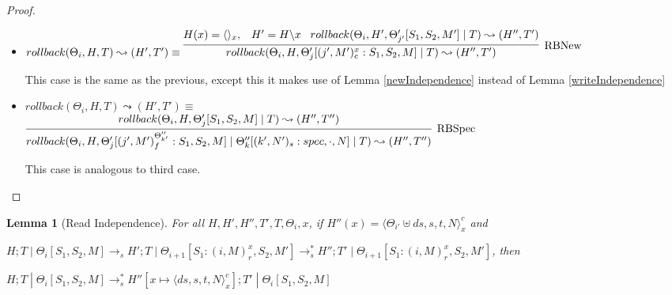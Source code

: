 \documentclass[9pt]{article}
\newtheorem{lemma}{Lemma}
\newcommand\specStep{\rightarrow_{s}}
\begin{document}
\begin{proof}
\begin{itemize}
\item $rollback(\Theta_i, H, T) \leadsto (H', T') \equiv \infer[\text{RBNew}]{rollback(\Theta_i, H, \Theta_j'[(j', M')_c^x : S_1, S_2, M] \; | \; T) \leadsto (H'', T')}{H(x) = \langle\rangle_x, \;\;\; H' = H \backslash x \;\;\; rollback(\Theta_i, H', \Theta_{j'}'[S_1, S_2, M'] \; | \; T) \leadsto (H'', T')}$

This case is the same as the previous, except this it makes use of Lemma \ref{newIndependence} instead of Lemma \ref{writeIndependence}

\item $rollback(\Theta_i, H, T) \leadsto (H', T') \equiv$ \\
$ \infer[\text{RBSpec}]{rollback(\Theta_i, H, \Theta_j'[(j', M')_f^{\Theta_{k'}''} : S_1, S_2, M] \; | \; \Theta_k''[(k', N')_s : spec, \cdot, N] \; | \; T) \leadsto (H'', T'')}{rollback(\Theta_i, H, \Theta_j'[S_1, S_2, M] \; | \; T) \leadsto (H'', T'')}$

This case is analogous to third case.

\end{itemize}

\end{proof}

\begin{lemma}[Read Independence]
\label{readIndependence}
For all $H, H', H'', T', T, \Theta_i, x$, if $H''(x) = \langle \Theta_{i'} \uplus ds, s, t, N\rangle_x^c$ and 

$H; T \; | \; \Theta_i[S_1, S_2, M] \specStep H'; T \; | \; \Theta_{i+1}[S_1 : (i, M)_r^x, S_2, M'] \specStep^* H''; T' \; | \; \Theta_{i+1}[S_1 : (i, M)_r^x, S_2, M']$, then 

$H; T \; | \; \Theta_i[S_1, S_2, M] \specStep^* H''[x\mapsto \langle ds, s, t, N\rangle_x^c]; T' \; | \; \Theta_i[S_1, S_2, M]$
\end{lemma}
\end{document}
